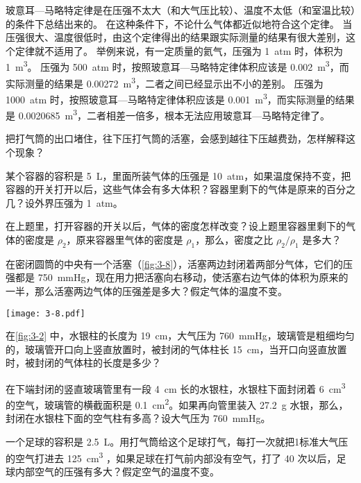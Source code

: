 \medskip
玻意耳—马略特定律是在压强不太大（和大气压比较）、温度不太低（和室温比较）的条件下总结出来的。
在这种条件下，不论什么气体都近似地符合这个定律。
当压强很大、温度很低时，由这个定律得出的结果跟实际测量的结果有很大差别，这个定律就不适用了。
举例来说，有一定质量的氦气，压强为 \qty{1}{atm} 时，体积为 \qty{1}{m^3}。
压强为 \qty{500}{atm} 时，按照玻意耳—马略特定律体积应该是 \qty{0.002}{m^3}，而实际测量的结果是 \qty{0.00272}{m^3}，二者之间已经显示出不小的差别。
压强为 \qty{1000}{atm} 时，按照玻意耳—马略特定律体积应该是 \qty{0.001}{m^3}，而实际测量的结果是 \qty{0.0020685}{m^3}，二者相差一倍多，根本无法应用玻意耳—马略特定律了。

\begin{Practice}
\begin{question}
	\item 把打气筒的出口堵住，往下压打气筒的活塞，会感到越往下压越费劲，怎样解释这个现象？
	\item 某个容器的容积是 \qty{5}{L}，里面所装气体的压强是 \qty{10}{atm}，如果温度保持不变，把容器的开关打开以后，这些气体会有多大体积？容器里剩下的气体是原来的百分之几？设外界压强为 \qty{1}{atm}。
	\item 在上题里，打开容器的开关以后，气体的密度怎样改变？设上题里容器里剩下的气体的密度是 $\rho_2$，原来容器里气体的密度是 $\rho_1$，那么，密度之比 $\rho_2/\rho_1$ 是多大？
	\item 在密闭圆筒的中央有一个活塞（\cref{fig:3-8}），活塞两边封闭着两部分气体，它们的压强都是 \qty{750}{mmHg}，现在用力把活塞向右移动，使活塞右边气体的体积为原来的一半，那么活塞两边气体的压强差是多大？假定气体的温度不变。
	\begin{figurehere}
		\begin{minipage}{\linewidth}\centering
			\texttt{[image: 3-8.pdf]}
			\caption{}\label{fig:3-8}
		\end{minipage}
	\end{figurehere}
	\item 在\cref{fig:3-2} 中，水银柱的长度为 \qty{19}{cm}，大气压为 \qty{760}{mmHg}，玻璃管是粗细均匀的，玻璃管开口向上竖直放置时，被封闭的气体柱长 \qty{15}{cm}，当开口向竖直放置时，被封闭的气体柱的长度是多少？
	\item 在下端封闭的竖直玻璃管里有一段 \qty{4}{cm} 长的水银柱，水银柱下面封闭着 \qty{6}{cm^3} 的空气，玻璃管的横截面积是 \qty{0.1}{cm^2}。如果再向管里装入 \qty{27.2}{g} 水银，那么，封闭在水银柱下面的空气柱有多高？设大气压为 \qty{760}{mmHg}。
	\item 一个足球的容积是 \qty{2.5}{L}。用打气筒给这个足球打气，每打一次就把1标准大气压的空气打进去 \qty{125}{cm^3} ，如果足球在打气前内部没有空气，打了 40 次以后，足球内部空气的压强有多大？假定空气的温度不变。
\end{question}
\end{Practice}

